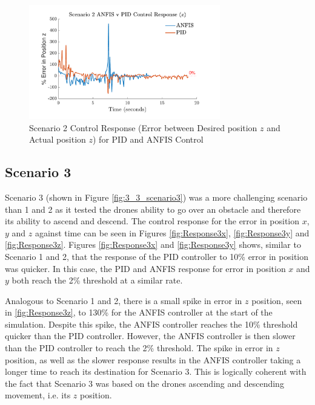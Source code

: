 \begin{figure}[H]
    \centering
    \begin{minipage}[b]{0.45\textwidth}
    \end{minipage}
    \hfill
    \begin{minipage}[b]{0.45\textwidth}
        \centering
        \includegraphics[height=5cm,keepaspectratio]{img/Scenario 2 Error in z Position.pdf}
        \caption{Scenario 2 Control Response (Error between Desired position $z$ and Actual position $z$) for PID and ANFIS Control}
        \label{fig:Response2z}
    \end{minipage}
    \hfill
    \begin{minipage}[b]{0.45\textwidth}
    \end{minipage}
\end{figure}

\subsection{Scenario 3}

Scenario 3 (shown in Figure \ref{fig:3_3_scenario3}) was a more challenging scenario than 1 and 2 as it tested the drones ability to go over an obstacle and therefore its ability to ascend and descend. The control response for the error in position $x$, $y$ and $z$ against time can be seen in Figures \ref{fig:Response3x}, \ref{fig:Response3y} and \ref{fig:Response3z}. Figures \ref{fig:Response3x} and \ref{fig:Response3y} shows, similar to Scenario 1 and 2, that the response of the PID controller to 10\% error in position was quicker. In this case, the PID and ANFIS response for error in position $x$ and $y$ both reach the 2\% threshold at a similar rate. 

Analogous to Scenario 1 and 2, there is a small spike in error in $z$ position, seen in \ref{fig:Response3z}, to 130\% for the ANFIS controller at the start of the simulation. Despite this spike, the ANFIS controller reaches the 10\% threshold quicker than the PID controller. However, the ANFIS controller is then slower than the PID controller to reach the 2\% threshold. The spike in error in $z$ position, as well as the slower response results in the ANFIS controller taking a longer time to reach its destination for Scenario 3. This is logically coherent with the fact that Scenario 3 was based on the drones ascending and descending movement, i.e. its $z$ position. 

